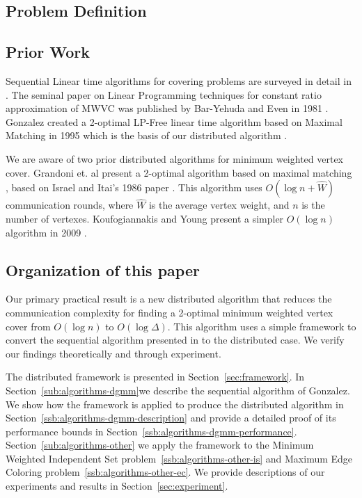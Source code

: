 \documentclass[conference, 10pt, letter]{IEEEtran}
\begin{document}
\subsection{Problem Definition}

\subsection{Prior Work}

Sequential Linear time algorithms for covering problems are surveyed in detail in \cite{254190}. The seminal paper on Linear Programming techniques for constant ratio approximation of MWVC was published by Bar-Yehuda and Even in 1981 \cite{Bar-Yehuda:1981lr}. Gonzalez created a 2-optimal LP-Free linear time algorithm based on Maximal Matching in 1995 which is the basis of our distributed algorithm \cite{Gonzalez1995129}. 

We are aware of two prior distributed algorithms for minimum weighted vertex cover. Grandoni et. al present a 2-optimal algorithm based on maximal matching \cite{1435381}, based on Israel and Itai's 1986 paper \cite{Israel:1986:FSR:5361.5365}. This algorithm uses $O(\log n + \hat{W})$ communication rounds, where $\hat{W}$ is the average vertex weight, and $n$ is the number of vertexes. Koufogiannakis and Young present a simpler $O(\log n)$ algorithm in 2009 \cite{1582746}.

\subsection{Organization of this paper}
Our primary practical result is a new distributed algorithm that reduces the communication complexity for finding a 2-optimal minimum weighted vertex cover from $O(\log n)$ to $O(\log \Delta)$. This algorithm uses a simple framework to convert the sequential algorithm presented in \cite{Gonzalez1995129} to the distributed case. We verify our findings theoretically and through experiment.

The distributed framework is presented in Section~\ref{sec:framework}. In Section~\ref{sub:algorithms-dgmm}we describe the sequential algorithm of Gonzalez. We show how the framework is applied to produce the distributed algorithm in Section~\ref{ssb:algorithms-dgmm-description} and provide a detailed proof of its performance bounds in Section~\ref{ssb:algorithms-dgmm-performance}. Section~\ref{sub:algorithms-other} we apply the framework to the Minimum Weighted Independent Set problem~\ref{ssb:algorithms-other-is} and Maximum Edge Coloring problem~\ref{ssb:algorithms-other-ec}. We provide descriptions of our experiments and results in Section~\ref{sec:experiment}. 
 
\end{document}

